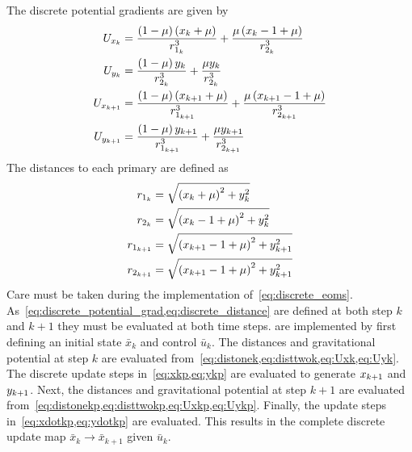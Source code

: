 \documentclass[letterpaper, preprint, paper,11pt]{AAS}	%
\begin{document}
The discrete potential gradients are given by
\begin{subequations}\label{eq:discrete_potential_grad}
\begin{align}
	U_{\xk} &= \frac{\parenth{1 -\mu} \parenth{\xk + \mu}}{\distonek^3} + \frac{ \mu \parenth{\xk -1 + \mu}}{\disttwok^3} \label{eq:Uxk}\\
	U_{\yk} &= \frac{\parenth{1 -\mu} \yk}{\disttwok^3} + \frac{ \mu \yk}{\disttwok^3} \label{eq:Uyk} \\
	U_{\xkp} &= \frac{\parenth{1 -\mu} \parenth{\xkp + \mu}}{\distonekp^3} + \frac{ \mu \parenth{\xkp -1 + \mu}}{\disttwokp^3} \label{eq:Uxkp}\\
	U_{\ykp} &= \frac{\parenth{1 -\mu} \ykp}{\distonekp^3} + \frac{ \mu \ykp}{\disttwokp^3} \label{eq:Uykp}
\end{align}	
\end{subequations}
The distances to each primary are defined as
\begin{subequations}\label{eq:discrete_distance}
\begin{align}
	\distonek &= \sqrt{\left( \xk + \mu\right)^2 + \yk^2} \label{eq:distonek}\\
	\disttwok &= \sqrt{\left( \xk - 1 + \mu\right)^2 + \yk^2} \label{eq:disttwok}\\
	\distonekp &= \sqrt{\left( \xkp - 1 + \mu\right)^2 + \ykp^2} \label{eq:distonekp}\\
	\disttwokp &= \sqrt{\left( \xkp - 1 + \mu\right)^2 + \ykp^2} \label{eq:disttwokp}
\end{align}
\end{subequations}
Care must be taken during the implementation of~\cref{eq:discrete_eoms}.
As~\cref{eq:discrete_potential_grad,eq:discrete_distance} are defined at both step \( k \) and \( k+1 \) they must be evaluated at both time steps.
 are implemented by first defining an initial state \( \bar{x}_k \) and control \( \bar{u}_k \).
The distances and gravitational potential at step \( k \) are evaluated from~\cref{eq:distonek,eq:disttwok,eq:Uxk,eq:Uyk}.
The discrete update steps in~\cref{eq:xkp,eq:ykp} are evaluated to generate \( x_{k+1} \) and \( y_{k+1}\).
Next, the distances and gravitational potential at step \( k+1 \) are evaluated from~\cref{eq:distonekp,eq:disttwokp,eq:Uxkp,eq:Uykp}. 
Finally, the update steps in~\cref{eq:xdotkp,eq:ydotkp} are evaluated.
This results in the complete discrete update map \( \bar{x}_k \to \bar{x}_{k+1} \) given \( \bar{u}_k \).
\end{document}
